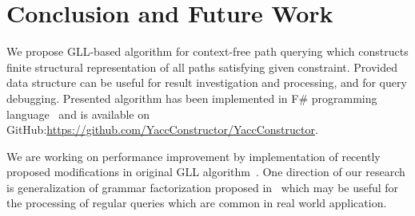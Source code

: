 \section{Conclusion and Future Work}

We propose GLL-based algorithm for context-free path querying which constructs finite structural representation of all paths satisfying given constraint.
Provided data structure can be useful for result investigation and processing, and for query debugging.
Presented algorithm has been implemented in F\# programming language~\cite{FSharp} and is available on GitHub:\url{https://github.com/YaccConstructor/YaccConstructor}.

We are working on performance improvement by implementation of recently proposed modifications in original GLL algorithm~\cite{FGLL,FastPracticalGLL}.
One direction of our research is generalization of grammar factorization proposed in~\cite{FGLL} which may be useful for the processing of regular queries which are common in real world application.
